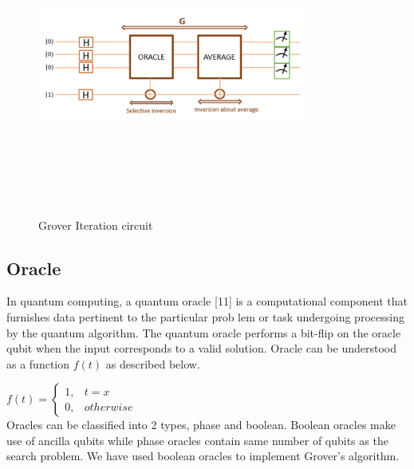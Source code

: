 \documentclass[conference]{IEEEtran}
\begin{document}
\begin{figure}[htbp]
	\centerline{\includegraphics[width=9cm,height=10cm,keepaspectratio]{fig4.png}}
	\caption{Grover Iteration circuit}
	\label{fig4}
\end{figure}

\subsection{Oracle}
In
quantum computing, a quantum oracle [11] is a computational
component that furnishes data pertinent to the particular prob
lem or task undergoing processing by the quantum algorithm.
The quantum oracle performs a bit-flip on the oracle qubit when the input corresponds to a valid solution. Oracle can be understood as a function $ f(t) $ as described below.

$ f(t) = \begin{cases}
		1, & t = x     \\
		0, & otherwise
	\end{cases} $
\\
Oracles can be classified into 2 types, phase and boolean. Boolean oracles make use of ancilla qubits while phase oracles contain same number of qubits as the search problem. We have used boolean oracles to implement Grover's algorithm.
\end{document}
